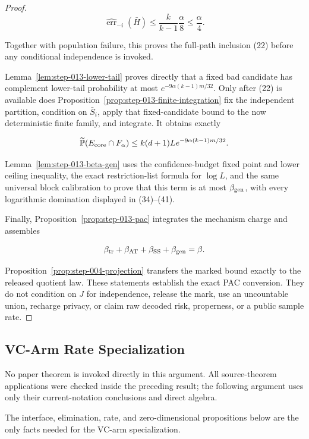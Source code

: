 \begin{proof}
\[
 \widehat{\operatorname{err}}_{-i}(\bar H)
 \leq\frac{k}{k-1}\frac\alpha8\leq\frac\alpha4.
\]

Together with population failure, this proves the full-path inclusion (22)
before any conditional independence is invoked.

Lemma~\ref{lem:step-013-lower-tail} proves directly that a fixed bad
candidate has complement lower-tail probability at most
\(e^{-9\alpha(k-1)m/32}\). Only after (22) is available does
Proposition~\ref{prop:step-013-finite-integration} fix the independent
partition, condition on \(\bar S_i\), apply that fixed-candidate bound to
the now deterministic finite family, and integrate. It obtains exactly

\[
 \widetilde{\mathbb P}(E_{\rm core}\cap F_\alpha)
 \leq k(d+1)L e^{-9\alpha(k-1)m/32}.
\]

Lemma~\ref{lem:step-013-beta-gen} uses the confidence-budget fixed point and
lower ceiling inequality, the exact restriction-list formula for \(\log L\), and
the same  universal block calibration to prove that this term is at most
\(\beta_{\rm gen}\), with every logarithmic domination displayed in
(34)--(41).

Finally, Proposition~\ref{prop:step-013-pac} integrates the 
mechanism charge and assembles

\[
 \beta_{\rm tr}+\beta_{\rm AT}+\beta_{\rm SS}+\beta_{\rm gen}=\beta.
\]

Proposition~\ref{prop:step-004-projection} transfers the marked
bound exactly to the released quotient law. These statements establish the
 exact PAC conversion. They do not condition on \(J\) for independence,
release the mark, use an uncountable union, recharge privacy, or claim raw
decoded risk, properness, or a public sample rate.



\end{proof}

\subsection{VC-Arm Rate Specialization}\label{app:step_014}


No paper theorem is invoked directly in this argument. All source-theorem
applications were checked inside the preceding result; the following argument uses
only their  current-notation conclusions and direct algebra.

The interface, elimination, rate, and zero-dimensional propositions below are
the only facts needed for the VC-arm specialization.

